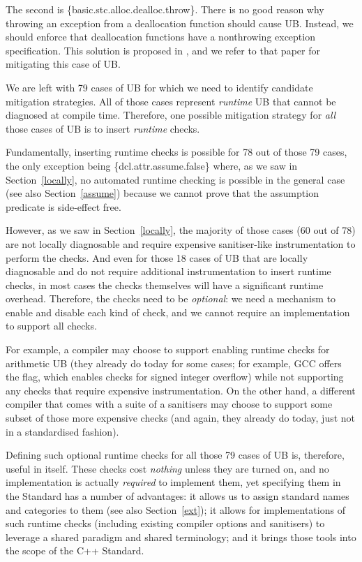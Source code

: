 The second is \{basic.stc.alloc.dealloc.throw\}. There is no good reason why throwing an exception from a deallocation function should cause UB. Instead, we should enforce that deallocation functions have a nonthrowing exception specification. This solution is proposed in \cite{P3424R0}, and we refer to that paper for mitigating this case of UB.

We are left with 79 cases of UB for which we need to identify candidate mitigation strategies. All of those cases represent \emph{runtime} UB that cannot be diagnosed at compile time. Therefore, one possible mitigation strategy for \emph{all} those cases of UB is to insert \emph{runtime} checks.

Fundamentally, inserting runtime checks is possible for 78 out of those 79 cases, the only exception being \{dcl.attr.assume.false\} where, as we saw in Section~\ref{locally}, no automated runtime checking is possible in the general case (see also Section~\ref{assume}) because we cannot prove that the assumption predicate is side-effect free.

However, as we saw in Section~\ref{locally}, the majority of those cases (60 out of 78) are not locally diagnosable and require expensive sanitiser-like instrumentation to perform the checks. And even for those 18 cases of UB that are locally diagnosable and do not require additional instrumentation to insert runtime checks, in most cases the checks themselves will have a significant runtime overhead. Therefore, the checks need to be \emph{optional}: we need a mechanism to enable and disable each kind of check, and we cannot require an implementation to support all checks.

For example, a compiler may choose to support enabling runtime checks for arithmetic UB (they already do today for some cases; for example, GCC offers the  flag, which enables checks for signed integer overflow) while not supporting any checks that require expensive instrumentation. On the other hand, a different compiler that comes with a suite of a sanitisers may choose to support some subset of those more expensive checks (and again, they already do today, just not in a standardised fashion).

Defining such optional runtime checks for all those 79 cases of UB is, therefore, useful in itself. These checks cost \emph{nothing} unless they are turned on, and no implementation is actually \emph{required} to implement them, yet specifying them in the Standard has a number of advantages: it allows us to assign standard names and categories to them (see also Section~\ref{ext}); it allows for implementations of such runtime checks (including existing compiler options and sanitisers) to leverage a shared paradigm and shared terminology; and it brings those tools into the scope of the C++ Standard.

